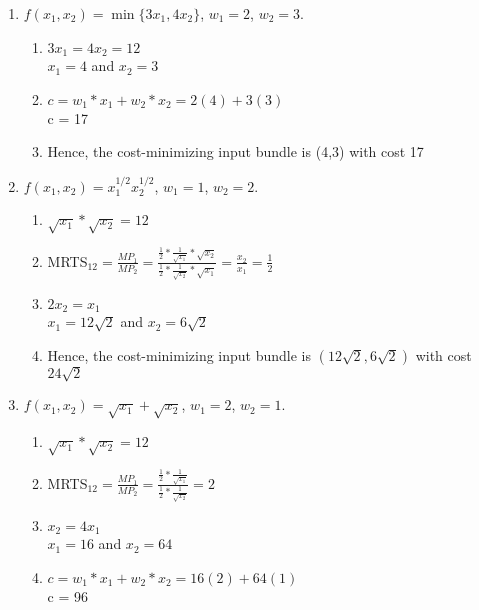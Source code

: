 \documentclass[11pt]{article}
\begin{document}
\begin{enumerate}
\begin{enumerate}
        \item $f(x_{1},x_{2})=\min\{3x_{1},4x_{2}\}$, $w_{1}=2$, $w_{2}=3$.
        \begin{enumerate}
            \item $3x_1 = 4x_2 = 12$\\
            $x_1 = 4$ and $x_2 = 3$
            \item $c = w_1 * x_1 + w_2*x_2 = 2(4) + 3(3)$\\
            c = 17
            \item Hence, the cost-minimizing input bundle is (4,3) with cost 17
        \end{enumerate}

        \item $f(x_{1},x_{2})=x_{1}^{1/2}x_{2}^{1/2}$, $w_{1}=1$, $w_{2}=2$.
        \begin{enumerate}
            \item $\sqrt{x_1}*\sqrt{x_2} = 12$
            \item MRTS$_{12} = \frac{MP_1}{MP_2} = \frac{\frac{1}{2}*\frac{1}{\sqrt{x_1}}*\sqrt{x_2}}{\frac{1}{2}*\frac{1}{\sqrt{x_2}}*\sqrt{x_1}} = \frac{x_2}{x_1} = \frac{1}{2}$
            \item $2x_2 = x_1$\\
            $x_1 = 12\sqrt{2}$ and  $x_2 = 6\sqrt{2}$
            \item Hence, the cost-minimizing input bundle is $(12\sqrt{2},6\sqrt{2})$ with cost $24\sqrt{2}$
        \end{enumerate}

        \item $f(x_{1},x_{2})=\sqrt{x_{1}}+\sqrt{x_{2}}$, $w_{1}=2$, $w_{2}=1$.
        \begin{enumerate}
            \item $\sqrt{x_1}*\sqrt{x_2} = 12$
            \item MRTS$_{12} = \frac{MP_1}{MP_2} = \frac{\frac{1}{2}*\frac{1}{\sqrt{x_1}}}{\frac{1}{2}*\frac{1}{\sqrt{x_2}}} = 2$
            \item $x_2 = 4x_1$\\
            $x_1 = 16$ and  $x_2 = 64$
            \item $c = w_1 * x_1 + w_2*x_2 = 16(2) + 64(1)$\\
            c = 96
            
        \end{enumerate}
    \end{enumerate}


\end{enumerate}
\end{document}
